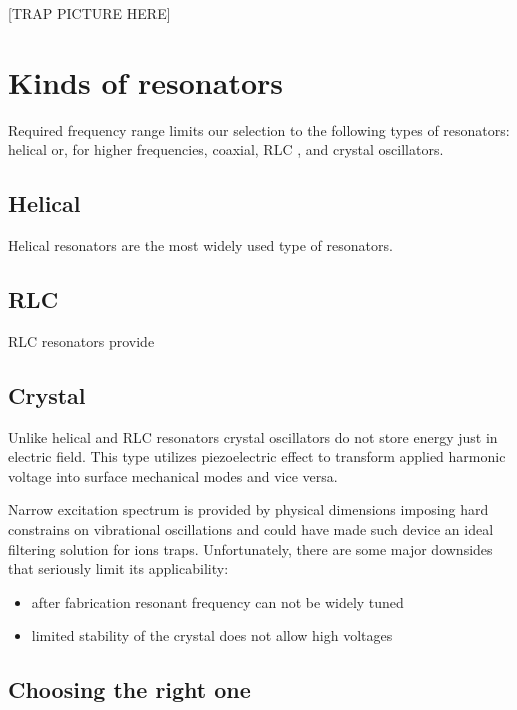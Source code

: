 [TRAP PICTURE HERE]

\section{Kinds of resonators}
\label{sec:kinds_resonators}
Required frequency range limits our selection to the following types of resonators: helical \cite{Gulde2017} or, for higher frequencies, coaxial, RLC \cite{Gandolfi2010}, and crystal oscillators.
\subsection{Helical}
Helical resonators are the most widely used type of resonators.
\subsection{RLC}
RLC resonators provide 
\subsection{Crystal}
Unlike helical and RLC resonators crystal oscillators do not store energy just in electric field. This type utilizes piezoelectric effect to transform applied harmonic voltage into surface mechanical modes and vice versa.

Narrow excitation spectrum is provided by physical dimensions imposing hard constrains on vibrational oscillations and could have made such device an ideal filtering solution for ions traps. Unfortunately, there are some major downsides that seriously limit its applicability:
\begin{itemize}
	\item after fabrication resonant frequency can not be widely tuned
	\item limited stability of the crystal does not allow high voltages
\end{itemize}
\subsection{Choosing the right one}